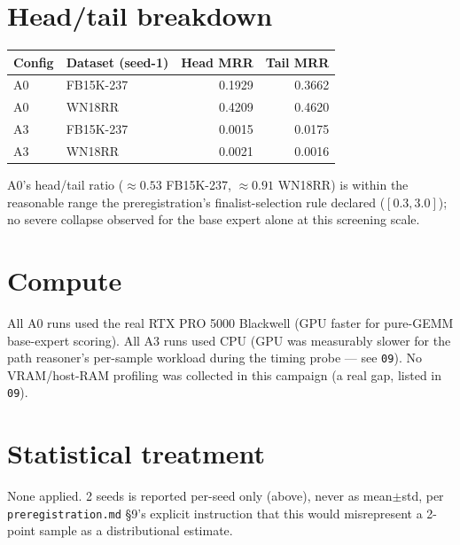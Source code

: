 \documentclass[11pt]{article}
\begin{document}
\section{Head/tail breakdown}
\begin{center}
\begin{tabular}{llrr}
\toprule
Config & Dataset (seed-1) & Head MRR & Tail MRR \\
\midrule
A0 & FB15K-237 & 0.1929 & 0.3662 \\
A0 & WN18RR & 0.4209 & 0.4620 \\
A3 & FB15K-237 & 0.0015 & 0.0175 \\
A3 & WN18RR & 0.0021 & 0.0016 \\
\bottomrule
\end{tabular}
\end{center}
A0's head/tail ratio ($\approx0.53$ FB15K-237, $\approx0.91$ WN18RR) is within the reasonable
range the preregistration's finalist-selection rule declared ($[0.3,3.0]$); no severe collapse
observed for the base expert alone at this screening scale.

\section{Compute}
All A0 runs used the real RTX PRO 5000 Blackwell (GPU faster for pure-GEMM base-expert scoring).
All A3 runs used CPU (GPU was measurably slower for the path reasoner's per-sample workload during
the timing probe --- see \texttt{09}). No VRAM/host-RAM profiling was collected in this campaign
(a real gap, listed in \texttt{09}).

\section{Statistical treatment}
None applied. 2 seeds is reported per-seed only (above), never as mean$\pm$std, per
\texttt{preregistration.md} \S9's explicit instruction that this would misrepresent a 2-point
sample as a distributional estimate.
\end{document}
